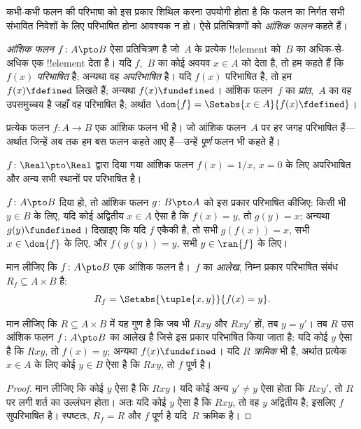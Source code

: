 \documentclass[../../../include/open-logic-section]{subfiles}
\begin{document}


\begin{explain}
कभी-कभी फलन की परिभाषा को इस प्रकार शिथिल करना उपयोगी होता है कि फलन का
निर्गत सभी संभावित निवेशों के लिए परिभाषित होना आवश्यक न हो। ऐसे
प्रतिचित्रणों को \emph{आंशिक फलन} कहते हैं।
\end{explain}

\begin{defn}
\emph{आंशिक फलन} $f \colon A \pto B$ ऐसा प्रतिचित्रण है जो~$A$ के प्रत्येक
!!{element} को~$B$ का अधिक-से-अधिक एक !!{element} देता है। यदि $f$,~$B$ का
कोई अवयव $x \in A$ को देता है, तो हम कहते हैं कि $f(x)$ \emph{परिभाषित} है;
अन्यथा वह \emph{अपरिभाषित} है। यदि $f(x)$ परिभाषित है, तो हम
$f(x) \fdefined$ लिखते हैं; अन्यथा $f(x) \fundefined$। आंशिक फलन~$f$ का
\emph{प्रांत},~$A$ का वह उपसमुच्चय है जहाँ वह परिभाषित है; अर्थात
$\dom{f} = \Setabs{x \in A}{f(x) \fdefined}$।
\end{defn}

\begin{ex}
प्रत्येक फलन $f\colon A \to B$ एक आंशिक फलन भी है। जो आंशिक फलन~$A$ पर
हर जगह परिभाषित हैं---अर्थात जिन्हें अब तक हम बस फलन कहते आए हैं---उन्हें
\emph{पूर्ण} फलन भी कहते हैं।
\end{ex}

\begin{ex}
$f \colon \Real \pto \Real$ द्वारा दिया गया आंशिक फलन $f(x) = 1/x$,
$x = 0$ के लिए अपरिभाषित और अन्य सभी स्थानों पर परिभाषित है।
\end{ex}

\begin{prob}
$f\colon A \pto B$ दिया हो, तो आंशिक फलन $g\colon B \pto
A$ को इस प्रकार परिभाषित कीजिए: किसी भी $y \in B$ के लिए, यदि कोई अद्वितीय
$x \in A$ ऐसा है कि $f(x) = y$, तो $g(y) = x$; अन्यथा
$g(y) \fundefined$। दिखाइए कि यदि $f$ एकैकी है, तो सभी
$g(f(x)) = x$, सभी $x \in \dom{f}$ के लिए, और
$f(g(y)) = y$, सभी $y \in \ran{f}$ के लिए।
\end{prob}

\begin{defn}[आंशिक फलन का आलेख]
मान लीजिए कि $f\colon A \pto B$ एक आंशिक फलन है।~$f$ का \emph{आलेख},
निम्न प्रकार परिभाषित संबंध $R_f \subseteq A \times B$ है:
\[
R_f = \Setabs{\tuple{x,y}}{f(x) = y}.
\]
\end{defn}

\begin{prop}
मान लीजिए कि $R \subseteq A \times B$ में यह गुण है कि जब भी $Rxy$
और $Rxy'$ हों, तब $y = y'$। तब $R$ उस आंशिक फलन $f\colon A \pto B$ का
आलेख है जिसे इस प्रकार परिभाषित किया जाता है: यदि कोई $y$ ऐसा है कि $Rxy$,
तो $f(x) = y$; अन्यथा $f(x) \fundefined$। यदि $R$ \emph{क्रमिक} भी है,
अर्थात प्रत्येक $x \in A$ के लिए कोई $y \in B$ ऐसा है कि $Rxy$, तो $f$
पूर्ण है।
\end{prop}

\begin{proof}
मान लीजिए कि कोई $y$ ऐसा है कि $Rxy$। यदि कोई अन्य $y'
\neq y$ ऐसा होता कि $Rxy'$, तो $R$ पर लगी शर्त का उल्लंघन होता। अतः यदि
कोई $y$ ऐसा है कि $Rxy$, तो वह $y$ अद्वितीय है; इसलिए $f$ सुपरिभाषित है।
स्पष्टतः, $R_f = R$ और $f$ पूर्ण है यदि~$R$ क्रमिक है।
\end{proof}
\end{document}
